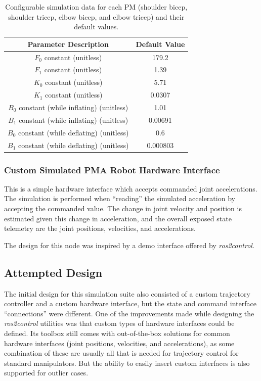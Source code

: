 \documentclass[conference]{IEEEtran}
\begin{document}
	\begin{table}
		\centering
		\begin{tabular}{|c|c|}
			\hline
			\textbf{Parameter Description} & \textbf{Default Value} \\\hline
			$F_{0}$ constant (unitless) & 179.2 \\\hline
			$F_{1}$ constant (unitless) & 1.39 \\\hline
			$K_{0}$ constant (unitless) & 5.71 \\\hline
			$K_{1}$ constant (unitless) & 0.0307 \\\hline
			$B_{0}$ constant (while inflating) (unitless) & 1.01 \\\hline
			$B_{1}$ constant (while inflating) (unitless) & 0.00691 \\\hline
			$B_{0}$ constant (while deflating) (unitless) & 0.6 \\\hline
			$B_{1}$ constant (while deflating) (unitless) & 0.000803 \\\hline
		\end{tabular}
		\caption{Configurable simulation data for each \ac{PM} (shoulder bicep, shoulder tricep, elbow bicep, and elbow tricep) and their default values.}
		\label{table:pm-sim-parameters}
	\end{table}

	\subsubsection{Custom Simulated PMA Robot Hardware Interface}\label{section:custom-hw-interface}

	This is a simple hardware interface which accepts commanded joint accelerations. The simulation is performed when ``reading'' the simulated
	acceleration by accepting the commanded value. The change in joint velocity and position is estimated given this change in acceleration, and the overall exposed state telemetry are the joint positions, velocities, and accelerations.

	The design for this node was inspired by a demo interface offered by \textit{ros2\textunderscore control}.

	\subsection{Attempted Design}\label{section:attempted-design}

	The initial design for this simulation suite also consisted of a custom trajectory controller and a custom hardware interface, but the state and command interface ``connections'' were different. One of the improvements made while designing the \textit{ros2\textunderscore control} utilities was that custom types of hardware interfaces could be defined. Its toolbox still comes with out-of-the-box solutions for common hardware interfaces (joint positions, velocities, and accelerations), as some combination of these are usually all that is needed for trajectory control for standard manipulators. But the ability to easily insert custom interfaces is also supported for outlier cases.
\end{document}
